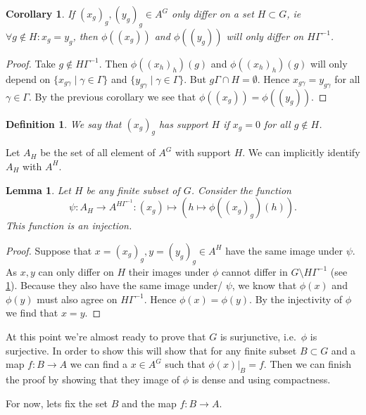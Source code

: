 \documentclass[titlepage, a4paper]{article}
\newtheorem{definition}[theorem]{Definition}
\newtheorem{lemma}[theorem]{Lemma}
\newtheorem{corollary}[theorem]{Corollary}
\theoremstyle{remark}
\begin{document}
\begin{corollary}\label{cor:differ_in_image}
	If $(x_g)_g, (y_g)_g \in A^{G}$ only differ on a set $H \subset G$, ie $\forall g \not\in H:x_g = y_g$,
	then  $\phi((x_g))$ and $\phi((y_g))$ will only differ on $H\Gamma^{-1}$.
\end{corollary}
\begin{proof}
	Take $g \not\in H\Gamma^{-1}$. Then $\phi((x_h)_h)(g)$ and $\phi((x_h)_h)(g)$ will only depend on  $\{x_{g\gamma}\mid \gamma \in \Gamma\}$ and $\{y_{g\gamma}\mid \gamma \in \Gamma\} $. But  $g\Gamma \cap H = \emptyset$. Hence $x_{g\gamma} = y_{g\gamma}$ for all $\gamma \in \Gamma$. By the previous corollary we see that $\phi((x_g)) = \phi((y_g))$.
\end{proof}

\begin{definition}
	We say that $(x_g)_g$ has support $H$ if $x_g = 0$ for all $g \not\in H$.
\end{definition}
Let $A_H$ be the set of all element of  $A^{G}$ with support $H$. We can implicitly identify $A_H$ with $A^{H}$.

\begin{lemma}\label{lem:injective_restriction}
	Let $H$ be any finite subset of $G$. Consider the function  \[
		\psi:A_H \to A ^{H\Gamma^{-1}}: (x_g) \mapsto \left(h \mapsto \phi((x_g)_g)(h)\right)
	.\]  
	This function is an injection. 
\end{lemma}
\begin{proof}
	Suppose that $x= (x_g)_g, y = (y_g)_g \in A^{H}$ have the same image under $\psi$. As $x, y$ can only differ on $ H$ their images under $\phi$ cannot differ in $G\setminus H\Gamma^{-1}$ (see \cref{cor:differ_in_image}). Because they also have the same image under/ $\psi$, we know that $\phi(x)$ and $\phi(y)$ must also agree on $H\Gamma^{-1}$. Hence $\phi(x) = \phi(y)$. By the injectivity of $\phi$ we find that $x = y$.
\end{proof}

At this point we're almost ready to prove that $G$ is surjunctive, i.e.\ $\phi$ is surjective. 
In order to show this will show that for any finite subset $B\subset G$ and a map $f:B \to A$ we can find a $x \in A^{G}$ such that $\phi\left(x \right) |_B  = f$. Then we can finish the proof by showing that they image of $\phi$ is dense and using compactness.

\bigskip

For now, lets fix the set $B$ and the map $f:B \to A$. 
\end{document}
